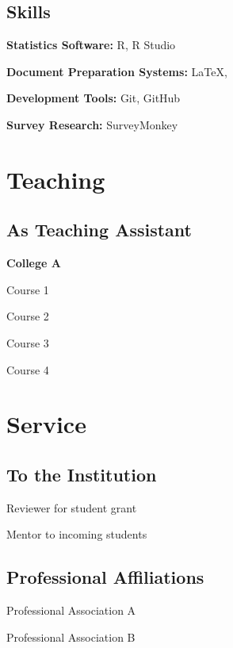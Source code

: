 \documentclass[letterpaper,11pt]{CV} %
\begin{document}


\subsection{Skills}

\textbf{Statistics Software:}
R, R Studio

\textbf{Document Preparation Systems:} \LaTeX, \BibTeX

\textbf{Development Tools:} Git, GitHub

\textbf{Survey Research:} SurveyMonkey 




\section{Teaching}

\subsection{As Teaching Assistant}



\textbf{College A}
\begin{innerlist}
	\item Course 1
	\item Course 2
	\item Course 3
	\item Course 4
\end{innerlist}




\section{Service}

\subsection{To the Institution}

Reviewer for student grant

Mentor to incoming students

\subsection{Professional Affiliations}

Professional Association A

Professional Association B

\vspace{0.1cm}






\end{document}
